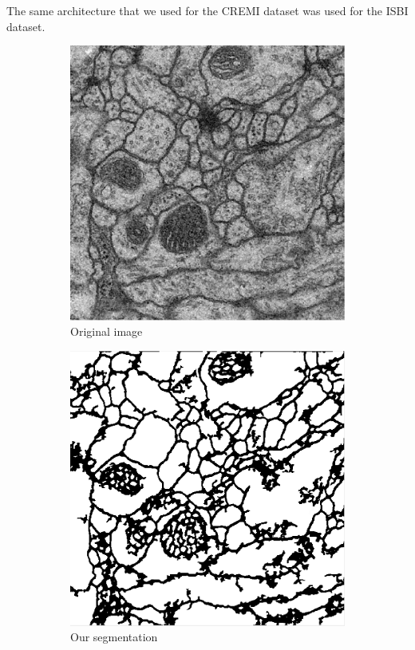The same architecture that we used for the CREMI dataset was used for the ISBI dataset.\\

\begin{figure}[!htbp]
    \centering
    \begin{subfigure}[t]{0.31\textwidth}
        \centering
        \includegraphics[height=0.7\textwidth]{./images/isbi_orig_1.png}
        \caption{Original image}
    \end{subfigure}%
    \begin{subfigure}[t]{0.31\textwidth}
        \centering
        \includegraphics[height=0.7\textwidth]{./images/isbi_out_1.png}
        \caption{Our segmentation}
    \end{subfigure}
    \begin{subfigure}[t]{0.31\textwidth}

\end{subfigure}
\end{figure}
